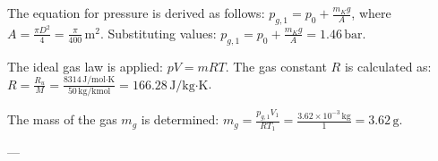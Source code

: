 The equation for pressure is derived as follows:  
\( p_{g,1} = p_0 + \frac{m_K g}{A} \), where \( A = \frac{\pi D^2}{4} = \frac{\pi}{400} \, \text{m}^2 \).  
Substituting values:  
\( p_{g,1} = p_0 + \frac{m_K g}{A} = 1.46 \, \text{bar} \).  

The ideal gas law is applied:  
\( pV = mRT \).  
The gas constant \( R \) is calculated as:  
\( R = \frac{R_u}{M} = \frac{8314 \, \text{J/mol·K}}{50 \, \text{kg/kmol}} = 166.28 \, \text{J/kg·K} \).  

The mass of the gas \( m_g \) is determined:  
\( m_g = \frac{p_{g,1} V_1}{R T_1} = \frac{3.62 \times 10^{-3} \, \text{kg}}{1} = 3.62 \, \text{g} \).  

---